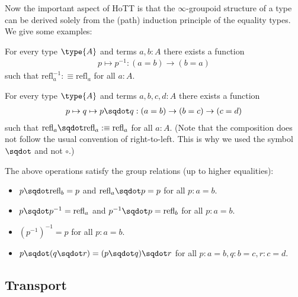     Now the important aspect of HoTT is that the $\infty$-groupoid structure of a type can be derived solely from the (path) induction principle of the equality types. We give some examples:
    \begin{property}[Inversion]
        For every type $\type{A}$ and terms $a,b:A$ there exists a function
        \begin{gather}
            p\mapsto p^{-1}:(a=b)\rightarrow(b=a)
        \end{gather}
        such that $\text{refl}_a^{-1}:\equiv\text{refl}_a$ for all $a:A$.
    \end{property}
    \begin{property}[Concatenation]
        For every type $\type{A}$ and terms $a,b,c,d:A$ there exists a function
        \begin{gather}
            p\mapsto q\mapsto p\sqdot q:(a=b)\rightarrow(b=c)\rightarrow(c=d)
        \end{gather}
        such that $\text{refl}_a\sqdot\text{refl}_a:\equiv\text{refl}_a$ for all $a:A$. (Note that the composition does not follow the usual convention of right-to-left. This is why we used the symbol $\sqdot$ and not $\circ$.)
    \end{property}
    \begin{property}
        The above operations satisfy the group relations (up to higher equalities):
        \begin{itemize}
            \item $p\sqdot\text{refl}_b=p$ and $\text{refl}_a\sqdot p=p$ for all $p:a=b$.
            \item $p\sqdot p^{-1}=\text{refl}_a$ and $p^{-1}\sqdot p=\text{refl}_b$ for all $p:a=b$.
            \item $(p^{-1})^{-1}=p$ for all $p:a=b$.
            \item $p\sqdot(q\sqdot r) = (p\sqdot q)\sqdot r$ for all $p:a=b, q:b=c, r:c=d$.
        \end{itemize}
    \end{property}

\subsection{Transport}

